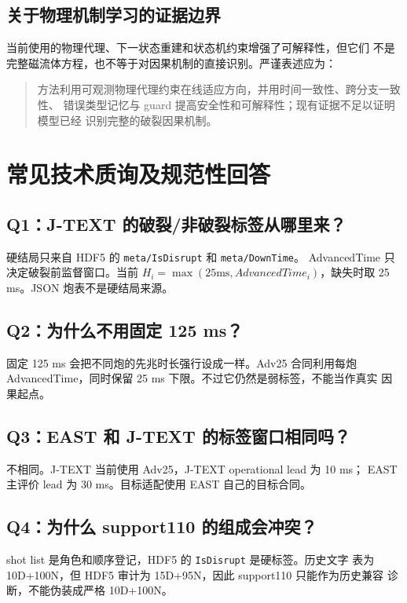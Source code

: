 \documentclass[11pt,a4paper]{article}
\newcommand{\code}[1]{\texttt{\small #1}}
\begin{document}
\subsection{关于物理机制学习的证据边界}

当前使用的物理代理、下一状态重建和状态机约束增强了可解释性，但它们
不是完整磁流体方程，也不等于对因果机制的直接识别。严谨表述应为：

\begin{quote}
方法利用可观测物理代理约束在线适应方向，并用时间一致性、跨分支一致性、
错误类型记忆与 guard 提高安全性和可解释性；现有证据不足以证明模型已经
识别完整的破裂因果机制。
\end{quote}

\section{常见技术质询及规范性回答}

\subsection*{Q1：J-TEXT 的破裂/非破裂标签从哪里来？}

硬结局只来自 HDF5 的 \code{meta/IsDisrupt} 和 \code{meta/DownTime}。
AdvancedTime 只决定破裂前监督窗口。当前 \(H_i=\max(25\mathrm{ms},
AdvancedTime_i)\)，缺失时取 25 ms。JSON 炮表不是硬结局来源。

\subsection*{Q2：为什么不用固定 125 ms？}

固定 125 ms 会把不同炮的先兆时长强行设成一样。Adv25 合同利用每炮
AdvancedTime，同时保留 25 ms 下限。不过它仍然是弱标签，不能当作真实
因果起点。

\subsection*{Q3：EAST 和 J-TEXT 的标签窗口相同吗？}

不相同。J-TEXT 当前使用 Adv25，J-TEXT operational lead 为 10 ms；
EAST 主评价 lead 为 30 ms。目标适配使用 EAST 自己的目标合同。

\subsection*{Q4：为什么 support110 的组成会冲突？}

shot list 是角色和顺序登记，HDF5 的 \code{IsDisrupt} 是硬标签。历史文字
表为 10D+100N，但 HDF5 审计为 15D+95N，因此 support110 只能作为历史兼容
诊断，不能伪装成严格 10D+100N。
\end{document}
